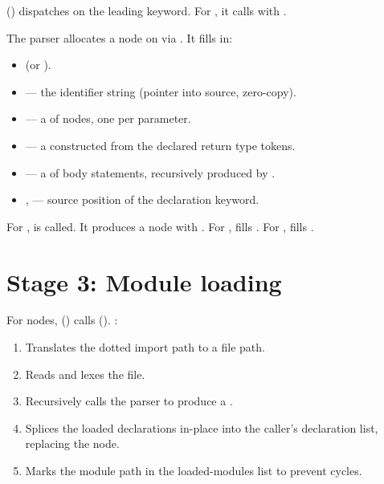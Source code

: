 \pnum
{} () dispatches on the leading
keyword.  For , it calls
 with .

\pnum
The parser allocates a  node on  via
.  It fills in:
\begin{itemize}
\item {} (or ).
\item {} — the identifier string (pointer into source, zero-copy).
\item {} — a  of
   nodes, one per parameter.
\item {} — a  constructed
  from the declared return type tokens.
\item {} — a  of body statements,
  recursively produced by .
\item {},  — source position of the declaration keyword.
\end{itemize}

\pnum
For ,  is called.
It produces a  node with .
For ,  fills .
For ,  fills .

\section{Stage 3: Module loading}
\label{sec:df-module}

\pnum
For  nodes, 
() calls  ().
:
\begin{enumerate}
\item Translates the dotted import path to a file path.
\item Reads and lexes the file.
\item Recursively calls the parser to produce a .
\item Splices the loaded declarations in-place into the caller's declaration
  list, replacing the  node.
\item Marks the module path in the loaded-modules list to prevent cycles.
\end{enumerate}

